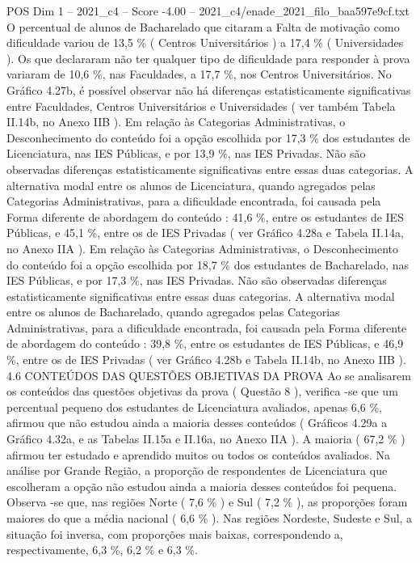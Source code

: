 \begin{textsample}{POS Dim 1 – 2021\_c4 – Score -4.00 – 2021\_c4/enade\_2021\_filo\_baa597e9cf.txt}
O percentual de alunos de Bacharelado que citaram a Falta de motivação como dificuldade variou de 13,5 \% ( Centros Universitários ) a 17,4 \% ( Universidades ).
Os que declararam não ter qualquer tipo de dificuldade para responder à prova variaram de 10,6 \%, nas Faculdades, a 17,7 \%, nos Centros Universitários.
No Gráfico 4.27b, é possível observar não há diferenças estatisticamente significativas entre Faculdades, Centros Universitários e Universidades ( ver também Tabela II.14b, no Anexo IIB ).
Em relação às Categorias Administrativas, o Desconhecimento do conteúdo foi a opção escolhida por 17,3 \% dos estudantes de Licenciatura, nas IES Públicas, e por 13,9 \%, nas IES Privadas.
Não são observadas diferenças estatisticamente significativas entre essas duas categorias.
A alternativa modal entre os alunos de Licenciatura, quando agregados pelas Categorias Administrativas, para a dificuldade encontrada, foi causada pela Forma diferente de abordagem do conteúdo : 41,6 \%, entre os estudantes de IES Públicas, e 45,1 \%, entre os de IES Privadas ( ver Gráfico 4.28a e Tabela II.14a, no Anexo IIA ).
Em relação às Categorias Administrativas, o Desconhecimento do conteúdo foi a opção escolhida por 18,7 \% dos estudantes de Bacharelado, nas IES Públicas, e por 17,3 \%, nas IES Privadas.
Não são observadas diferenças estatisticamente significativas entre essas duas categorias.
A alternativa modal entre os alunos de Bacharelado, quando agregados pelas Categorias Administrativas, para a dificuldade encontrada, foi causada pela Forma diferente de abordagem do conteúdo : 39,8 \%, entre os estudantes de IES Públicas, e 46,9 \%, entre os de IES Privadas ( ver Gráfico 4.28b e Tabela II.14b, no Anexo IIB ). 4.6 CONTEÚDOS DAS QUESTÕES OBJETIVAS DA PROVA Ao se analisarem os conteúdos das questões objetivas da prova ( Questão 8 ), verifica -se que um percentual pequeno dos estudantes de Licenciatura avaliados, apenas 6,6 \%, afirmou que não estudou ainda a maioria desses conteúdos ( Gráficos 4.29a a Gráfico 4.32a, e as Tabelas II.15a e II.16a, no Anexo IIA ).
A maioria ( 67,2 \% ) afirmou ter estudado e aprendido muitos ou todos os conteúdos avaliados.
Na análise por Grande Região, a proporção de respondentes de Licenciatura que escolheram a opção não estudou ainda a maioria desses conteúdos foi pequena.
Observa -se que, nas regiões Norte ( 7,6 \% ) e Sul ( 7,2 \% ), as proporções foram maiores do que a média nacional ( 6,6 \% ).
Nas regiões Nordeste, Sudeste e Sul, a situação foi inversa, com proporções mais baixas, correspondendo a, respectivamente, 6,3 \%, 6,2 \% e 6,3 \%.

\end{textsample}

